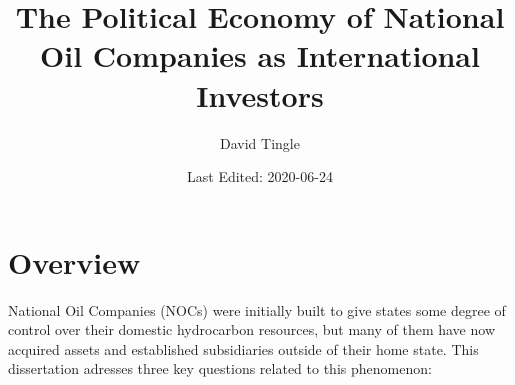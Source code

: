\documentclass[11pt,]{book}
\title{The Political Economy of National Oil Companies as International Investors}
\author{David Tingle}
\date{Last Edited: 2020-06-24}
\begin{document}
\maketitle

{
\setcounter{tocdepth}{1}
\tableofcontents
}
\hypertarget{overview}{%
\chapter*{Overview}\label{overview}}

National Oil Companies (NOCs) were initially built to give states some degree of control over their domestic hydrocarbon resources, but many of them have now acquired assets and established subsidiaries outside of their home state. This dissertation adresses three key questions related to this phenomenon:
\end{document}
